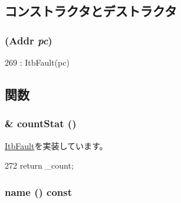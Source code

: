 \subsection{コンストラクタとデストラクタ}
\hypertarget{classAlphaISA_1_1ItbAcvFault_aca2f01a9f9bd3bc50411a4f3e2be0840}{
\subsubsection[{ItbAcvFault}]{ ({\bf Addr} {\em pc})}}
\label{classAlphaISA_1_1ItbAcvFault_aca2f01a9f9bd3bc50411a4f3e2be0840}



\begin{DoxyCode}
269 : ItbFault(pc) { }
\end{DoxyCode}


\subsection{関数}
\hypertarget{classAlphaISA_1_1ItbAcvFault_a6c79663c761ff57265459f7e3aefaf4c}{
\subsubsection[{countStat}]{\& countStat ()}}
\label{classAlphaISA_1_1ItbAcvFault_a6c79663c761ff57265459f7e3aefaf4c}


\hyperlink{classAlphaISA_1_1ItbFault_a4b643982263b390349238a6711216763}{ItbFault}を実装しています。


\begin{DoxyCode}
272 {return _count;}
\end{DoxyCode}
\hypertarget{classAlphaISA_1_1ItbAcvFault_a73adb23259baf912a81683a9790a303f}{
\subsubsection[{name}]{ name () const}}
\label{classAlphaISA_1_1ItbAcvFault_a73adb23259baf912a81683a9790a303f}


